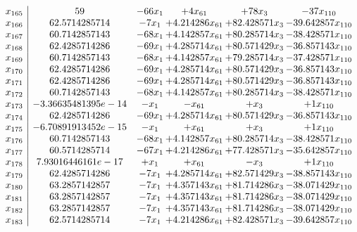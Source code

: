 \documentclass[11pt]{article}
\begin{document}
\[\begin{array}{c| c c@{\hskip 2pt} c@{\hskip 2pt} c@{\hskip 2pt} c@{\hskip 2pt} }
 x_{165}   &  59 & -66 x_{1} & + 4 x_{61} & + 78 x_{3} & -37 x_{110}\\
 x_{166}   &  62.5714285714 & -7 x_{1} & + 4.214286 x_{61} & + 82.428571 x_{3} & -39.642857 x_{110}\\
 x_{167}   &  60.7142857143 & -68 x_{1} & + 4.142857 x_{61} & + 80.285714 x_{3} & -38.428571 x_{110}\\
 x_{168}   &  62.4285714286 & -69 x_{1} & + 4.285714 x_{61} & + 80.571429 x_{3} & -36.857143 x_{110}\\
 x_{169}   &  60.7142857143 & -68 x_{1} & + 4.142857 x_{61} & + 79.285714 x_{3} & -37.428571 x_{110}\\
 x_{170}   &  62.4285714286 & -69 x_{1} & + 4.285714 x_{61} & + 80.571429 x_{3} & -36.857143 x_{110}\\
 x_{171}   &  62.4285714286 & -69 x_{1} & + 4.285714 x_{61} & + 80.571429 x_{3} & -36.857143 x_{110}\\
 x_{172}   &  60.7142857143 & -68 x_{1} & + 4.142857 x_{61} & + 80.285714 x_{3} & -38.428571 x_{110}\\
 x_{173}   &  -3.36635481395e-14 & - x_{1} & - x_{61} & +  x_{3} & + 1 x_{110}\\
 x_{174}   &  62.4285714286 & -69 x_{1} & + 4.285714 x_{61} & + 80.571429 x_{3} & -36.857143 x_{110}\\
 x_{175}   &  -6.70891913452e-15 & - x_{1} & +  x_{61} & +  x_{3} & + 1 x_{110}\\
 x_{176}   &  60.7142857143 & -68 x_{1} & + 4.142857 x_{61} & + 80.285714 x_{3} & -38.428571 x_{110}\\
 x_{177}   &  60.5714285714 & -67 x_{1} & + 4.214286 x_{61} & + 77.428571 x_{3} & -35.642857 x_{110}\\
 x_{178}   &  7.93016446161e-17 & +  x_{1} & +  x_{61} & - x_{3} & + 1 x_{110}\\
 x_{179}   &  62.4285714286 & -7 x_{1} & + 4.285714 x_{61} & + 82.571429 x_{3} & -38.857143 x_{110}\\
 x_{180}   &  63.2857142857 & -7 x_{1} & + 4.357143 x_{61} & + 81.714286 x_{3} & -38.071429 x_{110}\\
 x_{181}   &  63.2857142857 & -7 x_{1} & + 4.357143 x_{61} & + 81.714286 x_{3} & -38.071429 x_{110}\\
 x_{182}   &  63.2857142857 & -7 x_{1} & + 4.357143 x_{61} & + 81.714286 x_{3} & -38.071429 x_{110}\\
 x_{183}   &  62.5714285714 & -7 x_{1} & + 4.214286 x_{61} & + 82.428571 x_{3} & -39.642857 x_{110}\\

\end{array}\]
\end{document}
